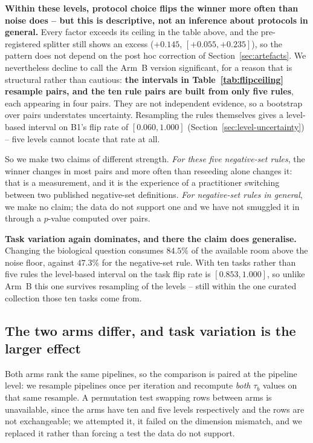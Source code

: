 \documentclass[11pt,a4paper]{article}
\begin{document}
\textbf{Within these levels, protocol choice flips the winner more often than noise does --
but this is descriptive, not an inference about protocols in general.} Every factor exceeds
its ceiling in the table above, and the pre-registered splitter still shows an excess
(${+}0.145$, $[{+}0.055, {+}0.235]$), so the pattern does not depend on the post hoc
correction of Section~\ref{sec:artefacts}. We nevertheless decline to call the Arm~B
version significant, for a reason that is structural rather than cautious: \textbf{the
intervals in Table~\ref{tab:flipceiling} resample pairs, and the ten rule pairs are built
from only five rules}, each appearing in four pairs. They are not independent evidence, so
a bootstrap over pairs understates uncertainty. Resampling the rules themselves gives a
level-based interval on B1's flip rate of $[0.060, 1.000]$
(Section~\ref{sec:level-uncertainty}) -- five levels cannot locate that rate at all.

So we make two claims of different strength. \emph{For these five negative-set rules}, the
winner changes in most pairs and more often than reseeding alone changes it: that is a
measurement, and it is the experience of a practitioner switching between two published
negative-set definitions. \emph{For negative-set rules in general}, we make no claim; the
data do not support one and we have not smuggled it in through a $p$-value computed over
pairs.

\textbf{Task variation again dominates, and there the claim does generalise.} Changing the
biological question consumes $84.5\%$ of the available room above the noise floor, against
$47.3\%$ for the negative-set rule. With ten tasks rather than five rules the level-based
interval on the task flip rate is $[0.853, 1.000]$, so unlike Arm~B this one survives
resampling of the levels -- still within the one curated collection those ten tasks come
from.

\subsection{The two arms differ, and task variation is the larger effect}

Both arms rank the same pipelines, so the comparison is paired at the pipeline level: we
resample pipelines once per iteration and recompute \emph{both} $\tau_b$ values on that
same resample. A permutation test swapping rows between arms is unavailable, since the arms
have ten and five levels respectively and the rows are not exchangeable; we attempted it,
it failed on the dimension mismatch, and we replaced it rather than forcing a test the data
do not support.
\end{document}
